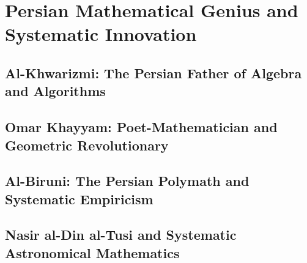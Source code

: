 
\chapter{Persian Mathematical Genius and Systematic Innovation}

\section{Al-Khwarizmi: The Persian Father of Algebra and Algorithms}

\section{Omar Khayyam: Poet-Mathematician and Geometric Revolutionary}

\section{Al-Biruni: The Persian Polymath and Systematic Empiricism}

\section{Nasir al-Din al-Tusi and Systematic Astronomical Mathematics}

